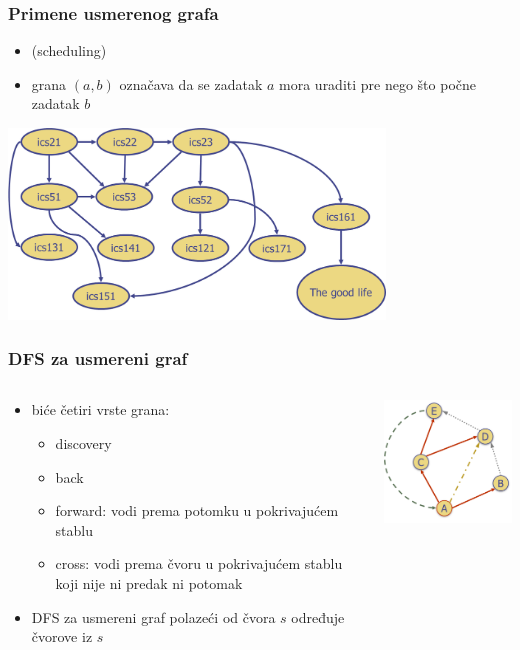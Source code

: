 \documentclass[compress,aspectratio=169]{beamer}
\begin{document}
\begin{frame}[fragile]
  \frametitle{Primene usmerenog grafa}
  \begin{itemize}
    \item {} (scheduling) 
    \item grana $(a,b)$ označava da se zadatak $a$ mora uraditi pre nego
      što počne zadatak $b$
  \end{itemize}
  \begin{center}
    \includegraphics[width=10cm]{asp-14-pic29.png}
  \end{center}
\end{frame}

\begin{frame}[fragile]
  \frametitle{DFS za usmereni graf}
  \begin{columns}
    \begin{column}[t]{6cm}
      \begin{itemize}
        \item biće četiri vrste grana:
        \begin{itemize}
          \item discovery
          \item back
          \item forward: vodi prema potomku u pokrivajućem stablu
          \item cross: vodi prema čvoru u pokrivajućem stablu koji nije ni predak ni potomak
        \end{itemize}
        \item DFS za usmereni graf polazeći od čvora $s$ određuje
          čvorove  iz $s$ 
      \end{itemize}
    \end{column}
    \begin{column}[t]{6cm}
      \begin{center}
        \includegraphics[width=5cm]{asp-14-pic30.png}
      \end{center}
    \end{column}
  \end{columns}
\end{frame}
\end{document}
